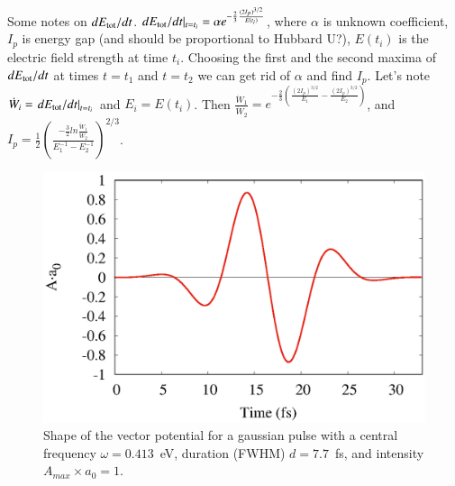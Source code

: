 {\color{red}{@HA Another question is what is the physical meaning of the derivative?  }}

Some notes on $dE_{\rm tot}/dt$.  
$dE_{\rm tot}/dt|_{t=t_i}=\alpha e^{-\frac{2}{3}\frac{(2I_p)^{3/2}}{E(t_i)}}$, where $\alpha$ is unknown coefficient, $I_p$ is energy gap (and should be proportional to Hubbard U?), $E(t_i)$ is the electric field strength at time $t_i$. 
{\color{red}{@HA How have you derived this expression? }} 
Choosing the first and the second maxima of $dE_{\rm tot}/dt$ at times $t=t_1$ and $t=t_2$ we can get rid of $\alpha$ and find $I_p$.  
{\color{red}{@HA I don't understand this sentence at all.  }}
Let's note ${\dot W}_i=\left.dE_{\rm tot}/dt\right|_{t=t_i}$ and $E_i = E(t_i)$. Then $\frac{{\dot W}_1}{{\dot W}_2}=e^{-\frac{2}{3}\left(\frac{(2I_p)^{3/2}}{E_1}-\frac{(2I_p)^{3/2}}{E_2}\right)}$, and $I_p = \frac{1}{2}\left( \frac{-\frac{3}{2}ln\frac{{\dot W}_1}{{\dot W}_2}}{E_1^{-1}-E_2^{-1}} \right)^{2/3}$.  
{\color{red}{@HA So what you wanted to say with this? }}


\begin{figure}
 \includegraphics[width=0.5\linewidth,angle=0]{figures/Pulse3A1.eps}
\caption{Shape of the vector potential for a gaussian pulse with a central frequency $\omega=0.413$~eV, duration (FWHM) $d=7.7$~fs, and intensity $A_{max}\times a_0=1$.}
\label{Pulse3A1}  
\end{figure}

